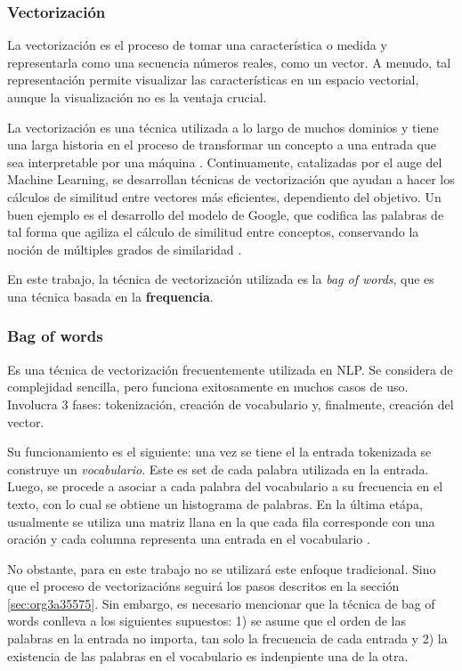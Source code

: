 \documentclass[12pt,letterpaper,twoside]{article}
\begin{document}
\subsubsection{Vectorización}
\label{sec:orgae0af22}
La vectorización es el proceso de tomar una característica o medida
y representarla como una secuencia números reales, como un vector. A menudo,
tal representación permite visualizar las características en un espacio
vectorial, aunque la visualización no es la ventaja crucial.

La vectorización es una técnica utilizada a lo largo de muchos
dominios y tiene una larga historia en el proceso de transformar
un concepto a una entrada que sea interpretable por una máquina
\cite{jha_abhishek_vectorization}.  Continuamente, catalizadas por
el auge del Machine Learning, se desarrollan técnicas de
vectorización que ayudan a hacer los cálculos de similitud entre
vectores más eficientes, dependiento del objetivo. Un buen
ejemplo es el desarrollo del modelo de Google, que
codifica las palabras de tal forma que agiliza el cálculo
de similitud entre conceptos, conservando la noción
de múltiples grados de similaridad \cite{mikolov2013efficient}.

En este trabajo, la técnica de vectorización utilizada es
la \emph{bag of words}, que es una técnica basada en la \textbf{frequencia}.

\subsubsection{Bag of words}
\label{sec:orge7bdb94}

Es una técnica de vectorización frecuentemente utilizada en NLP.
Se considera de complejidad sencilla, pero funciona exitosamente
en muchos casos de uso. Involucra 3 fases: tokenización, creación de vocabulario y,
finalmente, creación del vector.

Su funcionamiento es el siguiente: una vez se tiene el la entrada
tokenizada se construye un \emph{vocabulario}.  Este es set de cada
palabra utilizada en la entrada.  Luego, se procede a asociar a
cada palabra del vocabulario a su frecuencia en el texto, con lo
cual se obtiene un histograma de palabras. En la última etápa,
usualmente se utiliza una matriz llana en la que cada fila
corresponde con una oración y cada columna representa una entrada
en el vocabulario \cite{jha_abhishek_vectorization}.

No obstante, para en este trabajo no se utilizará este enfoque
tradicional.  Sino que el proceso de vectorizacións seguirá los
pasos descritos en la sección \ref{sec:org3a35575}. Sin embargo,
es necesario mencionar que la técnica de bag of words conlleva
a los siguientes supuestos: 1) se asume que el orden de las
palabras en la entrada no importa, tan solo la frecuencia
de cada entrada y 2) la existencia de las palabras en el
vocabulario es indenpiente una de la otra.  
\end{document}
